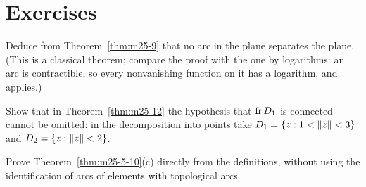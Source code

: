 
\section*{Exercises}

\begin{exercise}
Deduce from Theorem~\ref{thm:m25-9} that no arc in the plane separates the plane. (This is a
classical theorem; compare the proof with the one by logarithms: an arc is contractible, so every
nonvanishing function on it has a logarithm, and  applies.)
\end{exercise}

\begin{exercise}
Show that in Theorem~\ref{thm:m25-12} the hypothesis that $\operatorname{fr} D_1$ is connected cannot be omitted:
in the decomposition into points take $D_1=\left\{ z:1<\lVert z\rVert<3 \right\}$ and $D_2=\left\{ z:\lVert z\rVert<2 \right\}$.
\end{exercise}

\begin{exercise}
Prove Theorem~\ref{thm:m25-5-10}(c) directly from the definitions, without using the identification
of arcs of elements with topological arcs.
\end{exercise}
